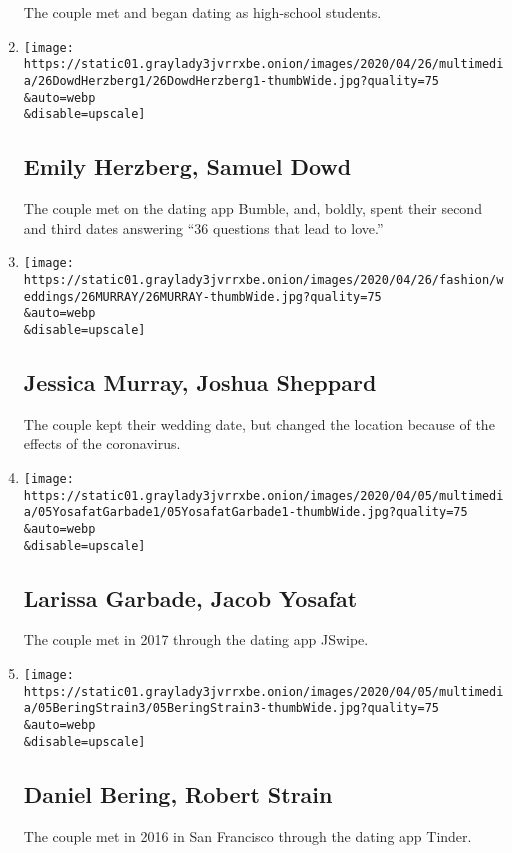 \begin{enumerate}
  The couple met and began dating as high-school students.
\item
  \href{/2020/04/26/fashion/weddings/emily-herzberg-samuel-dowd.html}{}

  \texttt{[image: https://static01.graylady3jvrrxbe.onion/images/2020/04/26/multimedia/26DowdHerzberg1/26DowdHerzberg1-thumbWide.jpg?quality=75\\\&auto=webp\\\&disable=upscale]}

  \hypertarget{emily-herzberg-samuel-dowd}{%
  \subsection{Emily Herzberg, Samuel
  Dowd}\label{emily-herzberg-samuel-dowd}}

  The couple met on the dating app Bumble, and, boldly, spent their
  second and third dates answering ``36 questions that lead to love.''
\item
  \href{/2020/04/26/fashion/weddings/jessica-murray-joshua-sheppard.html}{}

  \texttt{[image: https://static01.graylady3jvrrxbe.onion/images/2020/04/26/fashion/weddings/26MURRAY/26MURRAY-thumbWide.jpg?quality=75\\\&auto=webp\\\&disable=upscale]}

  \hypertarget{jessica-murray-joshua-sheppard}{%
  \subsection{Jessica Murray, Joshua
  Sheppard}\label{jessica-murray-joshua-sheppard}}

  The couple kept their wedding date, but changed the location because
  of the effects of the coronavirus.
\item
  \href{/2020/04/05/fashion/weddings/larissa-garbade-jacob-yosafat.html}{}

  \texttt{[image: https://static01.graylady3jvrrxbe.onion/images/2020/04/05/multimedia/05YosafatGarbade1/05YosafatGarbade1-thumbWide.jpg?quality=75\\\&auto=webp\\\&disable=upscale]}

  \hypertarget{larissa-garbade-jacob-yosafat}{%
  \subsection{Larissa Garbade, Jacob
  Yosafat}\label{larissa-garbade-jacob-yosafat}}

  The couple met in 2017 through the dating app JSwipe.
\item
  \href{/2020/04/05/fashion/weddings/daniel-bering-robert-strain.html}{}

  \texttt{[image: https://static01.graylady3jvrrxbe.onion/images/2020/04/05/multimedia/05BeringStrain3/05BeringStrain3-thumbWide.jpg?quality=75\\\&auto=webp\\\&disable=upscale]}

  \hypertarget{daniel-bering-robert-strain}{%
  \subsection{Daniel Bering, Robert
  Strain}\label{daniel-bering-robert-strain}}

  The couple met in 2016 in San Francisco through the dating app Tinder.
\end{enumerate}

